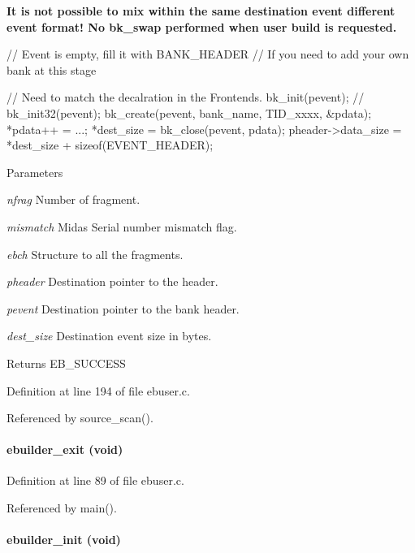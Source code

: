 {\bfseries  It is not possible to mix within the same destination event different event format! No bk\_\-swap performed when user build is requested. }


\begin{DoxyCode}
  // Event is empty, fill it with BANK_HEADER
  // If you need to add your own bank at this stage

  // Need to match the decalration in the Frontends.
  bk_init(pevent);  
//  bk_init32(pevent);
  bk_create(pevent, bank_name, TID_xxxx, &pdata);
  *pdata++ = ...;
  *dest_size = bk_close(pevent, pdata);
  pheader->data_size = *dest_size + sizeof(EVENT_HEADER);
\end{DoxyCode}



\begin{DoxyParams}{Parameters}
\item[{\em nfrag}]Number of fragment. \item[{\em mismatch}]Midas Serial number mismatch flag. \item[{\em ebch}]Structure to all the fragments. \item[{\em pheader}]Destination pointer to the header. \item[{\em pevent}]Destination pointer to the bank header. \item[{\em dest\_\-size}]Destination event size in bytes. \end{DoxyParams}
\begin{DoxyReturn}{Returns}
EB\_\-SUCCESS 
\end{DoxyReturn}


Definition at line 194 of file ebuser.c.

Referenced by source\_\-scan().
\paragraph[{ebuilder\_\-exit}]{ ebuilder\_\-exit (void)}\hfill\label{ebuser_8c_ac141e2e56f0c36a7ae2b64184528830e}


Definition at line 89 of file ebuser.c.

Referenced by main().
\paragraph[{ebuilder\_\-init}]{ ebuilder\_\-init (void)}\hfill\label{ebuser_8c_ad14be4274aaeb6325015173e54e549b8}


